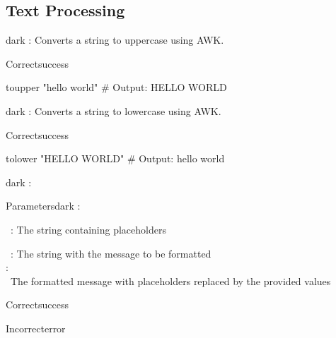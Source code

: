 \subsection{Text Processing}
\label{sec:component:sub:strinsg}

\begin{baseBoxThree}{}{dark}
    \bigskip
    : Converts a string to uppercase using AWK.
    \\

    \begin{baseBoxThree}{Correct}{success}
        \begin{posnex}
    toupper "hello world"
    # Output: HELLO WORLD
        \end{posnex}
    \end{baseBoxThree}
\end{baseBoxThree}
\bigskip

\begin{baseBoxThree}{}{dark}
    \bigskip
    : Converts a string to lowercase using AWK.
    \\

    \begin{baseBoxThree}{Correct}{success}
        \begin{posnex}
    tolower "HELLO WORLD"
    # Output: hello world
        \end{posnex}
    \end{baseBoxThree}
\end{baseBoxThree}
\bigskip
\begin{baseBoxThree}{}{dark}
    \bigskip
    :
    \\
	\begin{baseBoxThree}{Parameters}{dark}
        \smallskip
		:

        \sA~\sV{\textdollar}: The string containing placeholders

        \sA~\sV{\textdollar}: The string with the message to be formatted\\

        :\\
        \sA~The formatted message with placeholders replaced by the provided values
	\end{baseBoxThree}

    \begin{baseBoxThree}{Correct}{success}
        \begin{posnex}
        \end{posnex}
    \end{baseBoxThree}

    \begin{baseBoxThree}{Incorrect}{error}
        \begin{posnex}
        \end{posnex}
    \end{baseBoxThree}
\end{baseBoxThree}
\bigskip
